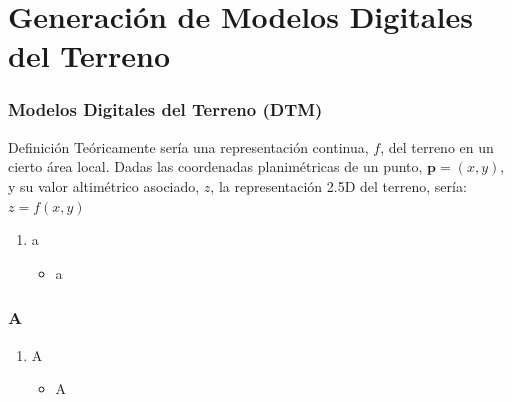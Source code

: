 \section{Generación de Modelos Digitales del Terreno}
\begin{frame}
  \frametitle{Modelos Digitales del Terreno (DTM)}
  \begin{beamerboxesrounded}[shadow=true]{Definición}
    Teóricamente sería una representación continua, $f$, del terreno en un
    cierto área local. Dadas las coordenadas planimétricas de un punto,
    $\mathbf{p}=(x,y)$, y su valor altimétrico asociado, $z$, la representación 2.5D del terreno, sería: $z=f(x,y)$
  \end{beamerboxesrounded}

  \begin{enumerate}
    \item  a
      \begin{itemize}
        \item  a
      \end{itemize}
  \end{enumerate}
\end{frame}
\begin{frame}
  \frametitle{A}
  \begin{enumerate}
    \item A
      \begin{itemize}
        \item  A
      \end{itemize}
  \end{enumerate}
\end{frame}
